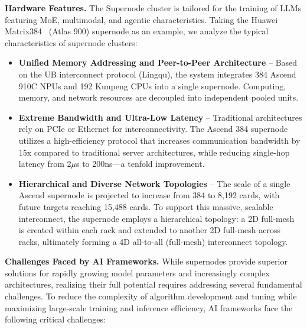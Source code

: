 \documentclass[11pt]{article}
\begin{document}
\noindent \textbf{Hardware Features.} The Supernode cluster is tailored for the training of LLMs featuring MoE, multimodal, and agentic characteristics. Taking the Huawei Matrix384~\cite{matrix384} (Atlas 900) supernode as an example, we analyze the typical characteristics of supernode clusters:


\begin{itemize}
    \item \textbf{Unified Memory Addressing and Peer-to-Peer Architecture} – Based on the UB interconnect protocol (Lingqu), the system integrates 384 Ascend 910C NPUs and 192 Kunpeng CPUs into a single supernode. Computing, memory, and network resources are decoupled into independent pooled units.
    \item \textbf{Extreme Bandwidth and Ultra-Low Latency} – Traditional architectures rely on PCIe or Ethernet for interconnectivity. The Ascend 384 supernode utilizes a high-efficiency protocol that increases communication bandwidth by 15x compared to traditional server architectures, while reducing single-hop latency from 2$\mu$s to 200ns—a tenfold improvement.
    \item \textbf{Hierarchical and Diverse Network Topologies} – The scale of a single Ascend supernode is projected to increase from 384 to 8,192 cards, with future targets reaching 15,488 cards. To support this massive, scalable interconnect, the supernode employs a hierarchical topology: a 2D full-mesh is created within each rack and extended to another 2D full-mesh across racks, ultimately forming a 4D all-to-all (full-mesh) interconnect topology.
\end{itemize}

\noindent \textbf{Challenges Faced by AI Frameworks.} While supernodes provide superior solutions for rapidly growing model parameters and increasingly complex architectures, realizing their full potential requires addressing several fundamental challenges. To reduce the complexity of algorithm development and tuning while maximizing large-scale training and inference efficiency, AI frameworks face the following critical challenges:
\end{document}
